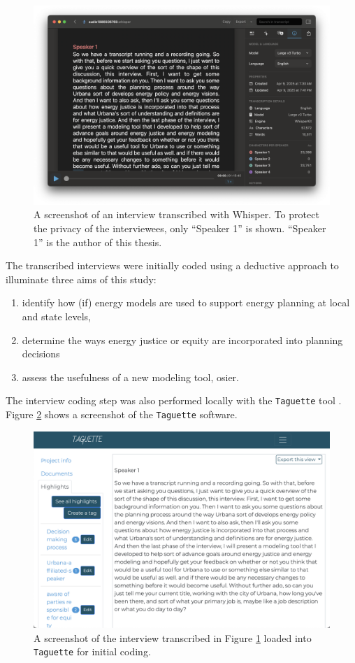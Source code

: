 \begin{figure}[htbp!]
    \centering
    \includegraphics[width=0.75\columnwidth]{figures/07_interview_chapter/whisper-screenshot.png}
    \caption{A screenshot of an interview transcribed with Whisper. To protect
    the privacy of the interviewees, only ``Speaker 1'' is shown. ``Speaker 1''
    is the author of this thesis.}
    \label{fig:whisper}
\end{figure}

The transcribed interviews were initially coded using a deductive approach to
illuminate three aims of this study:
\begin{enumerate}
    \item identify how (if) energy models are used to support energy planning at
    local and state levels,
    \item determine the ways energy justice or equity are incorporated into
    planning decisions
    \item assess the usefulness of a new modeling tool, \ac{osier}.
\end{enumerate} 
The interview coding step was also performed locally with the \texttt{Taguette}
tool \cite{rampin_taguette_2021}. Figure \ref{fig:taguette} shows a screenshot
of the \texttt{Taguette} software.

\begin{figure}[htbp!]
    \centering
    \includegraphics[width=0.75\columnwidth]{figures/07_interview_chapter/taguette-screenshot}
    \caption{A screenshot of the interview transcribed in Figure \ref{fig:whisper}
    loaded into \texttt{Taguette} for initial coding.}
    \label{fig:taguette}
\end{figure}

